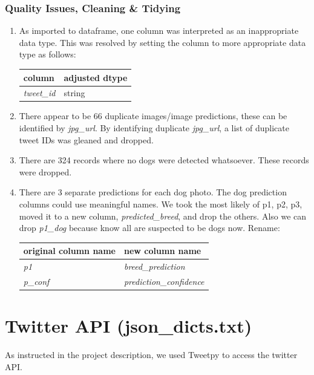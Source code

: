 \documentclass{report}
\begin{document}
		\subsubsection{Quality Issues, Cleaning \& Tidying}
			\begin{enumerate}
				\item As imported to dataframe, one column was  interpreted as an inappropriate data type. This was resolved by setting 
				the column to more appropriate data type as follows:\\
					\begin{tabular}{ll}
						\toprule
						\textbf{column} & \textbf{adjusted dtype} \\
						\midrule
						\textit{tweet\_id} & string \\
					\end{tabular}
				\item There appear to be 66 duplicate images/image predictions, these can be identified by \textit{jpg\_url}.
				By identifying duplicate \textit{jpg\_url}, a list of duplicate tweet IDs was gleaned and dropped.
				\item There are 324 records where no dogs were detected whatsoever. These records were dropped.
				\item There are 3 separate predictions for each dog photo. The dog prediction columns could use meaningful names. We 
				took the most likely of p1, p2, p3, moved it to a new column, \textit{predicted\_breed}, and drop the others. Also we can drop \textit{p1\_dog} because know all are 
				suspected to be dogs now. Rename:\\
					\begin{tabular}{ll}
						\toprule
						\textbf{original column name} & \textbf{new column name} \\
						\midrule
						\textit{p1} & \textit{breed\_prediction}  \\
						\textit{p\_conf} & \textit{prediction\_confidence}  \\						
					\end{tabular}
			\end{enumerate}

\section{Twitter API (\textbf{json\_dicts.txt})}

As instructed in the project description, we used Tweetpy to access the twitter API. 
\end{document}
